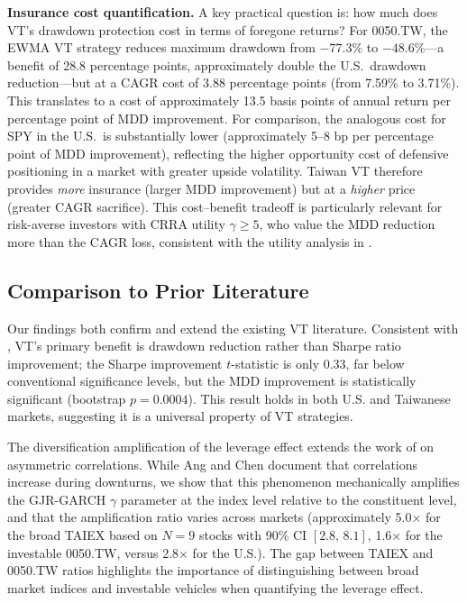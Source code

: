 \textbf{Insurance cost quantification.} A key practical question is: how much does VT's drawdown protection cost in terms of foregone returns? For 0050.TW, the EWMA VT strategy reduces maximum drawdown from $-77.3\%$ to $-48.6\%$---a benefit of 28.8 percentage points, approximately double the U.S.\ drawdown reduction---but at a CAGR cost of 3.88 percentage points (from 7.59\% to 3.71\%). This translates to a cost of approximately 13.5 basis points of annual return per percentage point of MDD improvement. For comparison, the analogous cost for SPY in the U.S.\ is substantially lower (approximately 5--8 bp per percentage point of MDD improvement), reflecting the higher opportunity cost of defensive positioning in a market with greater upside volatility. Taiwan VT therefore provides \textit{more} insurance (larger MDD improvement) but at a \textit{higher} price (greater CAGR sacrifice). This cost--benefit tradeoff is particularly relevant for risk-averse investors with CRRA utility $\gamma \geq 5$, who value the MDD reduction more than the CAGR loss, consistent with the utility analysis in \citet{moreira2017}.

\subsection{Comparison to Prior Literature}

Our findings both confirm and extend the existing VT literature. Consistent with \citet{moreira2017}, VT's primary benefit is drawdown reduction rather than Sharpe ratio improvement; the Sharpe improvement $t$-statistic is only 0.33, far below conventional significance levels, but the MDD improvement is statistically significant (bootstrap $p = 0.0004$). This result holds in both U.S. and Taiwanese markets, suggesting it is a universal property of VT strategies.

The diversification amplification of the leverage effect extends the work of \citet{ang2002} on asymmetric correlations. While Ang and Chen document that correlations increase during downturns, we show that this phenomenon mechanically amplifies the GJR-GARCH $\gamma$ parameter at the index level relative to the constituent level, and that the amplification ratio varies across markets (approximately 5.0$\times$ for the broad TAIEX based on $N = 9$ stocks with 90\% CI $[2.8, \, 8.1]$, 1.6$\times$ for the investable 0050.TW, versus 2.8$\times$ for the U.S.). The gap between TAIEX and 0050.TW ratios highlights the importance of distinguishing between broad market indices and investable vehicles when quantifying the leverage effect.

